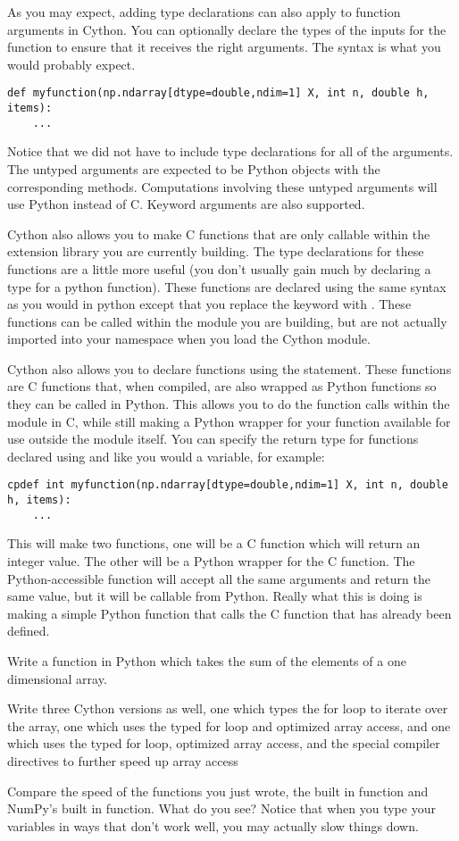 As you may expect, adding type declarations can also apply to function arguments in Cython.
You can optionally declare the types of the inputs for the function to ensure that it receives the right arguments.
The syntax is what you would probably expect.
\begin{lstlisting}
def myfunction(np.ndarray[dtype=double,ndim=1] X, int n, double h, items):
    ...
\end{lstlisting}
Notice that we did not have to include type declarations for all of the arguments.
The untyped arguments are expected to be Python objects with the corresponding methods. Computations involving these untyped arguments will use Python instead of C.
Keyword arguments are also supported.

Cython also allows you to make C functions that are only callable within the extension library you are currently building.
The type declarations for these functions are a little more useful (you don't usually gain much by declaring a type for a python function).
These functions are declared using the same syntax as you would in python except that you replace the keyword  with .
These functions can be called within the module you are building, but are not actually imported into your namespace when you load the Cython module.

Cython also allows you to declare functions using the  statement.
These functions are C functions that, when compiled, are also wrapped as Python functions so they can be called in Python.
This allows you to do the function calls within the module in C, while still making a Python wrapper for your function available for use outside the module itself.
You can specify the return type for functions declared using  and  like you would a variable, for example:
\begin{lstlisting}
cpdef int myfunction(np.ndarray[dtype=double,ndim=1] X, int n, double h, items):
    ...
\end{lstlisting}
This will make two functions, one will be a C function which will return an integer value.
The other will be a Python wrapper for the C function.
The Python-accessible function will accept all the same arguments and return the same value, but it will be callable from Python.
Really what this is doing is making a simple Python function that calls the C function that has already been defined.

\begin{problem}
Write a function in Python which takes the sum of the elements of a one dimensional array.

Write three Cython versions as well, one which types the for loop to iterate over the array, one which uses the typed for loop and optimized array access, and one which uses the typed for loop, optimized array access, and the special compiler directives to further speed up array access

Compare the speed of the functions you just wrote, the built in  function and NumPy's built in  function.
What do you see?
Notice that when you type your variables in ways that don't work well, you may actually slow things down.
\end{problem}

